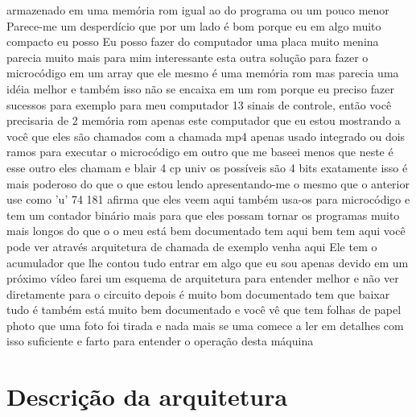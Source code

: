 \documentclass[oneside,11pt]{memoir} %
\begin{document}
armazenado em uma memória rom igual ao  do programa ou um pouco menor  Parece-me um desperdício que por um  lado é bom porque eu em algo muito  compacto eu posso  Eu posso fazer do computador uma placa muito  menina parecia muito mais para mim  interessante esta outra solução para fazer  o microcódigo em um array que ele mesmo  é uma memória rom mas parecia uma  idéia melhor e também isso não se encaixa em um  rom porque eu preciso fazer sucessos para  exemplo para meu computador 13 sinais  de controle, então você precisaria de 2  memória rom apenas este computador  que eu estou mostrando a você que eles são chamados  com a chamada  mp4  apenas usado integrado ou dois ramos  para executar o microcódigo  em outro que me baseei menos que neste é  esse outro eles chamam e blair 4 cp univ  os possíveis são 4 bits exatamente  isso é mais poderoso do que o que estou lendo  apresentando-me o mesmo que o anterior  use como 'u'  74 181 afirma que eles veem aqui também  usa-os para microcódigo e tem um  contador binário mais para que eles possam  tornar os programas muito mais longos do que o  o meu está bem documentado tem  aqui bem tem aqui você pode ver através  arquitetura de chamada de exemplo venha aqui  Ele tem o acumulador que lhe contou tudo  entrar em algo que eu sou apenas  devido em um próximo vídeo farei  um esquema de arquitetura para  entender melhor e não ver diretamente  para o circuito depois é muito bom  documentado tem que baixar tudo é  também está muito bem documentado e  você vê que tem folhas de papel photo  que uma foto foi tirada e nada mais se uma  comece a ler em detalhes com isso  suficiente e farto para entender o  operação desta máquina 



\chapter{Descrição da arquitetura}
\end{document}
